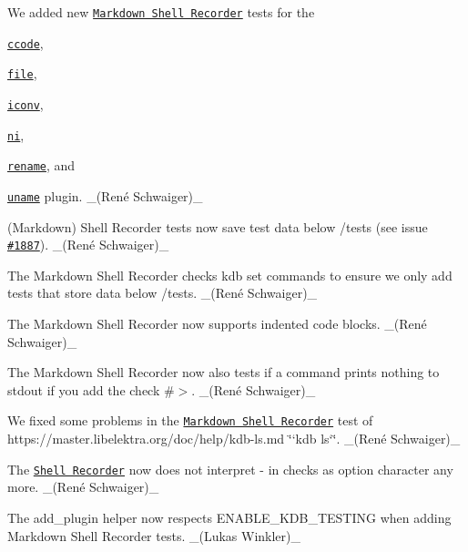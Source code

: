 \begin{DoxyItemize}
\item We added new \href{https://master.libelektra.org/tests/shell/shell_recorder/tutorial_wrapper}{\tt Markdown Shell Recorder} tests for the
\begin{DoxyItemize}
\item \href{https://www.libelektra.org/plugins/ccode}{\tt {\ttfamily ccode}},
\item \href{https://www.libelektra.org/plugins/file}{\tt {\ttfamily file}},
\item \href{https://www.libelektra.org/plugins/iconv}{\tt {\ttfamily iconv}},
\item \href{https://www.libelektra.org/plugins/ni}{\tt {\ttfamily ni}},
\item \href{https://www.libelektra.org/plugins/rename}{\tt {\ttfamily rename}}, and
\item \href{https://www.libelektra.org/plugins/uname}{\tt {\ttfamily uname}} plugin. \+\_\+(René Schwaiger)\+\_\+
\end{DoxyItemize}
\item (Markdown) Shell Recorder tests now save test data below {\ttfamily /tests} (see issue \href{https://github.com/ElektraInitiative/libelektra/issues/1887}{\tt \#1887}). \+\_\+(René Schwaiger)\+\_\+
\item The Markdown Shell Recorder checks {\ttfamily kdb set} commands to ensure we only add tests that store data below {\ttfamily /tests}. \+\_\+(René Schwaiger)\+\_\+
\item The Markdown Shell Recorder now supports indented code blocks. \+\_\+(René Schwaiger)\+\_\+
\item The Markdown Shell Recorder now also tests if a command prints nothing to {\ttfamily stdout} if you add the check {\ttfamily \#$>$}. \+\_\+(René Schwaiger)\+\_\+
\item We fixed some problems in the \href{https://master.libelektra.org/tests/shell/shell_recorder/tutorial_wrapper}{\tt Markdown Shell Recorder} test of https\+://master.libelektra.\+org/doc/help/kdb-\/ls.md \char`\"{}`kdb ls`\char`\"{}. \+\_\+(René Schwaiger)\+\_\+
\item The \href{(https://master.libelektra.org/tests/shell/shell_recorder)}{\tt Shell Recorder} now does not interpret {\ttfamily -\/} in checks as option character any more. \+\_\+(René Schwaiger)\+\_\+
\item The {\ttfamily add\+\_\+plugin} helper now respects {\ttfamily E\+N\+A\+B\+L\+E\+\_\+\+K\+D\+B\+\_\+\+T\+E\+S\+T\+I\+NG} when adding Markdown Shell Recorder tests. \+\_\+(\+Lukas Winkler)\+\_\+

\end{DoxyItemize}
